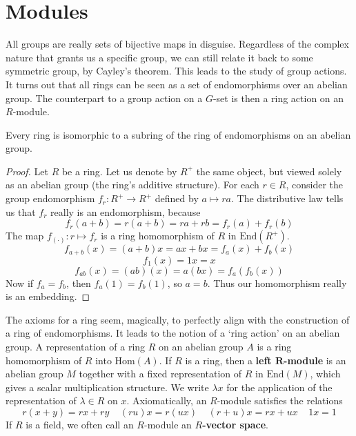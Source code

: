 \chapter{Modules}

All groups are really sets of bijective maps in disguise. Regardless of the complex nature that grants us a specific group, we can still relate it back to some symmetric group, by Cayley's theorem. This leads to the study of group actions. It turns out that all rings can be seen as a set of endomorphisms over an abelian group. The counterpart to a group action on a $G$-set is then a ring action on an $R$-module.

\begin{theorem}
    Every ring is isomorphic to a subring of the ring of endomorphisms on an abelian group.
\end{theorem}
\begin{proof}
    Let $R$ be a ring. Let us denote by $R^+$ the same object, but viewed solely as an abelian group (the ring's additive structure). For each $r \in R$, consider the group endomorphism $f_r:R^+ \to R^+$ defined by $a \mapsto ra$. The distributive law tells us that $f_r$ really is an endomorphism, because
    \[ f_r(a + b) = r(a + b) = ra + rb = f_r(a) + f_r(b) \]
    The map $f_{(\cdot)}: r \mapsto f_r$ is a ring homomorphism of $R$ in $\text{End}(R^+)$.
    \[  f_{a + b}(x) = (a + b)x = ax + bx = f_a(x) + f_b(x) \]
    \[ f_{1}(x) = 1x = x \]
    \[ f_{ab}(x) = (ab)(x) = a(bx) = f_a(f_b(x)) \]
    Now if $f_a = f_b$, then $f_a(1) = f_b(1)$, so $a = b$. Thus our homomorphism really is an embedding.
\end{proof}

The axioms for a ring seem, magically, to perfectly align with the construction of a  ring of endomorphisms. It leads to the notion of a `ring action' on an abelian group. A representation of a ring $R$ on an abelian group $A$ is a ring homomorphism of $R$ into $\text{Hom}(A)$. If $R$ is a ring, then a {\bf left $\mathbf{R}$-module} is an abelian group $M$ together with a fixed representation of $R$ in $\text{End}(M)$, which gives a scalar multiplication structure. We write $\lambda x$ for the application of the representation of $\lambda \in R$ on $x$. Axiomatically, an $R$-module satisfies the relations
%
\[r(x + y) = rx + ry\ \ \ \ \ (ru) x = r(ux)\ \ \ \ \ (r + u)x = rx + ux\ \ \ \ \ 1x = 1 \]
%
If $R$ is a field, we often call an $R$-module an {\bf $R$-vector space}.

